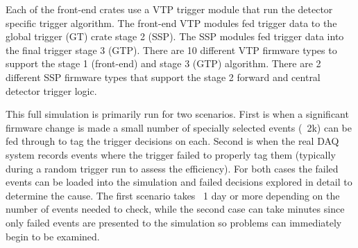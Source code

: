 Each of the front-end crates use a VTP trigger module that run the detector specific trigger algorithm. The front-end VTP modules fed trigger data to the global trigger (GT) crate stage 2 (SSP). The SSP modules fed trigger data into the final trigger stage 3 (GTP). There are 10 different VTP firmware types to support the stage 1 (front-end) and stage 3 (GTP) algorithm. There are 2 different SSP firmware types that support the stage 2 forward and central detector trigger logic.

This full simulation is primarily run for two scenarios. First is when a significant firmware change is made a small number of specially selected events (~2k) can be fed through to tag the trigger decisions on each. Second is when the real DAQ system records events where the trigger failed to properly tag them (typically during a random trigger run to assess the efficiency). For both cases the failed events can be loaded into the simulation and failed decisions explored in detail to determine the cause. The first scenario takes ~1 day or more depending on the number of events needed to check, while the second case can take minutes since only failed events are presented to the simulation so problems can immediately begin to be examined.